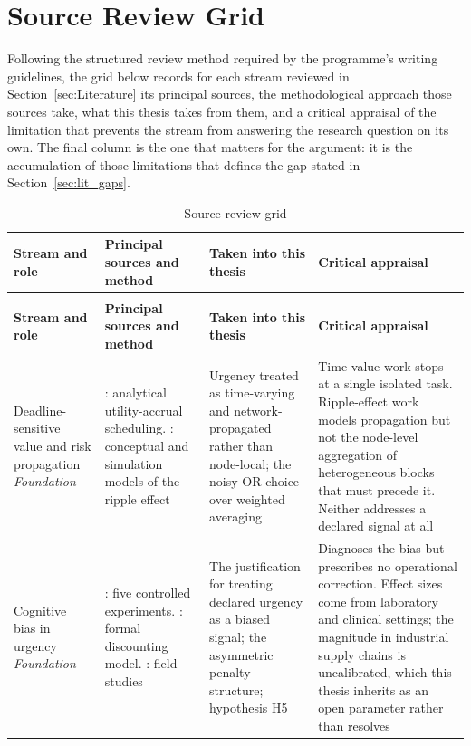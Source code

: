 \section{Source Review Grid}
\label{app:source_grid}

Following the structured review method required by the programme's writing guidelines, the
grid below records for each stream reviewed in Section~\ref{sec:Literature} its principal
sources, the methodological approach those sources take, what this thesis takes from them,
and a critical appraisal of the limitation that prevents the stream from answering the
research question on its own. The final column is the one that matters for the argument: it
is the accumulation of those limitations that defines the gap stated in
Section~\ref{sec:lit_gaps}.

\begin{longtable}{>{\raggedright\arraybackslash}p{2.6cm} >{\raggedright\arraybackslash}p{3.0cm} >{\raggedright\arraybackslash}p{3.4cm} >{\raggedright\arraybackslash}p{4.4cm}}
\caption{Source review grid}
\label{tab:source_grid} \\
\toprule
\textbf{Stream and role} & \textbf{Principal sources and method} & \textbf{Taken into this
thesis} & \textbf{Critical appraisal} \\
\midrule
\endfirsthead
\multicolumn{4}{l}{\small\itshape Table~\ref{tab:source_grid}, continued} \\
\toprule
\textbf{Stream and role} & \textbf{Principal sources and method} & \textbf{Taken into this
thesis} & \textbf{Critical appraisal} \\
\midrule
\endhead
\bottomrule
\endfoot

Deadline-sensitive value and risk propagation \newline \textit{Foundation} &
\autocite{cheng1996due,cheng2025survey}: analytical utility-accrual scheduling.
\autocite{ivanov2020digital,ivanov2019viable,li2020exploring}: conceptual and simulation
models of the ripple effect &
Urgency treated as time-varying and network-propagated rather than node-local; the
noisy-OR choice over weighted averaging &
Time-value work stops at a single isolated task. Ripple-effect work models propagation but
not the node-level aggregation of heterogeneous blocks that must precede it. Neither
addresses a declared signal at all \\
\midrule

Cognitive bias in urgency \newline \textit{Foundation} &
\autocite{zhu2018mere}: five controlled experiments. \autocite{steel2006integrating}: formal
discounting model. \autocite{rusou2020psychology,diwa2020task}: field studies &
The justification for treating declared urgency as a biased signal; the asymmetric penalty
structure; hypothesis H5 &
Diagnoses the bias but prescribes no operational correction. Effect sizes come from
laboratory and clinical settings; the magnitude in industrial supply chains is
uncalibrated, which this thesis inherits as an open parameter rather than resolves \\
\midrule


\end{longtable}
